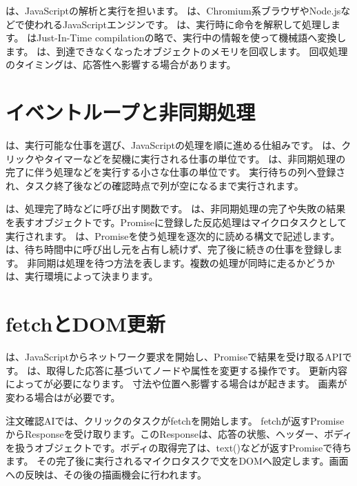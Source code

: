 は、JavaScriptの解析と実行を担います。
は、Chromium系ブラウザやNode.jsなどで使われるJavaScriptエンジンです。
は、実行時に命令を解釈して処理します。
はJust-In-Time compilationの略で、実行中の情報を使って機械語へ変換します。
は、到達できなくなったオブジェクトのメモリを回収します。
回収処理のタイミングは、応答性へ影響する場合があります。

\section{イベントループと非同期処理}

は、実行可能な仕事を選び、JavaScriptの処理を順に進める仕組みです。
は、クリックやタイマーなどを契機に実行される仕事の単位です。
は、非同期処理の完了に伴う処理などを実行する小さな仕事の単位です。
実行待ちの列へ登録され、タスク終了後などの確認時点で列が空になるまで実行されます。

は、処理完了時などに呼び出す関数です。
は、非同期処理の完了や失敗の結果を表すオブジェクトです。Promiseに登録した反応処理はマイクロタスクとして実行されます。
は、Promiseを使う処理を逐次的に読める構文で記述します。
は、待ち時間中に呼び出し元を占有し続けず、完了後に続きの仕事を登録します。
非同期は処理を待つ方法を表します。複数の処理が同時に走るかどうかは、実行環境によって決まります。

\section{fetchとDOM更新}

は、JavaScriptからネットワーク要求を開始し、Promiseで結果を受け取るAPIです。
は、取得した応答に基づいてノードや属性を変更する操作です。
更新内容によってが必要になります。
寸法や位置へ影響する場合はが起きます。
画素が変わる場合はが必要です。

注文確認AIでは、クリックのタスクがfetchを開始します。
fetchが返すPromiseからResponseを受け取ります。このResponseは、応答の状態、ヘッダー、ボディを扱うオブジェクトです。ボディの取得完了は、text()などが返すPromiseで待ちます。
その完了後に実行されるマイクロタスクで文をDOMへ設定します。画面への反映は、その後の描画機会に行われます。

